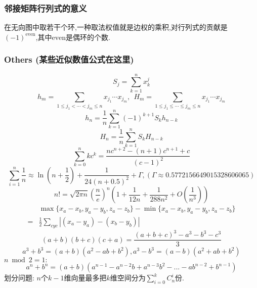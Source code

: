 \begin{small}
\subsubsection{邻接矩阵行列式的意义}
在无向图中取若干个环,一种取法权值就是边权的乘积,对行列式的贡献是$(-1)^{\mathrm{even}}$,其中$\mathrm{even}$是偶环的个数.

\subsubsection{Others (某些近似数值公式在这里)}
\[ S_j = \sum_{k=1}^nx_k^j \]
\[ h_m = \sum_{1\leq j_1 < \cdots < j_m \leq n} x_{j_1}\cdots x_{j_m},\ \ H_m = \sum_{1\leq j_1 \leq \cdots \leq j_m \leq n} x_{j_1}\cdots x_{j_m} \]
\[ h_n = \frac{1}{n}\sum_{k=1}^n(-1)^{k+1}S_kh_{n-k} \]
\[ H_n = \frac{1}{n}\sum_{k=1}^nS_kH_{n-k} \]
\[ \sum_{k=0}^nkc^k = \frac{nc^{n+2}-(n+1)c^{n+1}+c}{(c-1)^2} \]
\[ \sum_{i=1}^n\frac 1n\approx\ln(n + \frac12) + \frac{1}{24(n+0.5)^2}+\Gamma,(\Gamma\approx0.5772156649015328606065)\]
\[ n! = \sqrt{2\pi n}(\frac{n}{e})^n(1+\frac{1}{12n}+\frac{1}{288n^2}+O(\frac{1}{n^3})) \]
\[ \begin{aligned}
 &\max{\{x_a-x_b, y_a-y_b, z_a-z_b\}} - \min{\{x_a-x_b, y_a-y_b, z_a-z_b\}} \\
=& \frac{1}{2}\sum_{cyc}\left| (x_a-y_a)-(x_b-y_b) \right|
\end{aligned} \]
\[ (a+b)(b+c)(c+a) = \frac{(a+b+c)^3 - a^3 - b^3 - c^3}{3} \]
\[ a^3+b^3=(a+b)(a^2-ab+b^2),a^3-b^3=(a-b)(a^2+ab+b^2) \]
$n\bmod 2=1:$
\[ a^n+b^n=(a+b)(a^{n-1}-a^{n-2}b+a^{n-3}b^2-...-ab^{n-2}+b^{n-1})\]
划分问题: $n$个$k-1$维向量最多把$k$维空间分为$\sum_{i=0}^{k}C_n^i$份.
\end{small}
